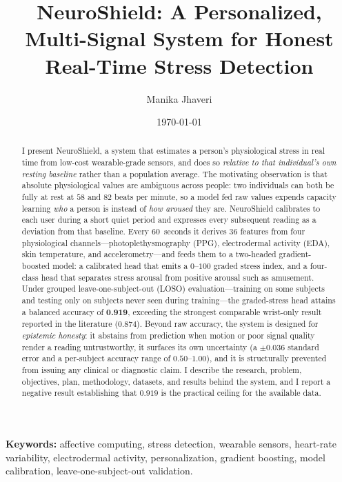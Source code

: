 \documentclass[11pt,a4paper]{article}
\title{\vspace{-1.2cm}\textbf{NeuroShield: A Personalized, Multi-Signal System for
Honest Real-Time Stress Detection}}
\author{Manika Jhaveri}
\date{\today}
\newcommand{\kpi}[1]{\textbf{#1}}
\begin{document}
\maketitle

\begin{abstract}
\noindent
I present NeuroShield, a system that estimates a person's physiological stress in real time from
low-cost wearable-grade sensors, and does so \emph{relative to that individual's own resting
baseline} rather than a population average. The motivating observation is that absolute
physiological values are ambiguous across people: two individuals can both be fully at rest at
$58$ and $82$ beats per minute, so a model fed raw values expends capacity learning \emph{who} a
person is instead of \emph{how aroused} they are. NeuroShield calibrates to each user during a short
quiet period and expresses every subsequent reading as a deviation from that baseline. Every
$60$~seconds it derives $36$ features from four physiological channels---photoplethysmography (PPG),
electrodermal activity (EDA), skin temperature, and accelerometry---and feeds them to a two-headed
gradient-boosted model: a calibrated head that emits a $0$--$100$ graded stress index, and a
four-class head that separates stress arousal from positive arousal such as amusement. Under
grouped leave-one-subject-out (LOSO) evaluation---training on some subjects and testing only on
subjects never seen during training---the graded-stress head attains a balanced accuracy of
\kpi{0.919}, exceeding the strongest comparable wrist-only result reported in the literature
($0.874$). Beyond raw accuracy, the system is designed for \emph{epistemic honesty}: it abstains
from prediction when motion or poor signal quality render a reading untrustworthy, it surfaces its
own uncertainty (a $\pm 0.036$ standard error and a per-subject accuracy range of $0.50$--$1.00$),
and it is structurally prevented from issuing any clinical or diagnostic claim. I describe the
research, problem, objectives, plan, methodology, datasets, and results behind the system, and I
report a negative result establishing that $0.919$ is the practical ceiling for the available data.
\end{abstract}

\vspace{0.3em}
\noindent\textbf{Keywords:} affective computing, stress detection, wearable sensors, heart-rate
variability, electrodermal activity, personalization, gradient boosting, model calibration,
leave-one-subject-out validation.
\end{document}
